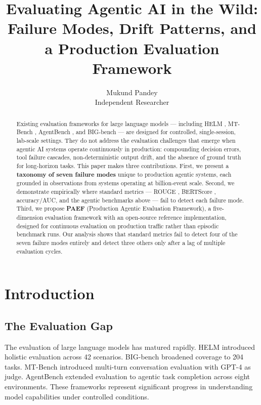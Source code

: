 \documentclass{article}
\title{Evaluating Agentic AI in the Wild: Failure Modes, Drift Patterns,
       and a Production Evaluation Framework}
\author{%
  Mukund Pandey \\
  Independent Researcher
}
\begin{document}
\maketitle

\begin{abstract}
Existing evaluation frameworks for large language models --- including HELM
\citep{liang2022helm}, MT-Bench \citep{zheng2023mtbench}, AgentBench
\citep{liu2023agentbench}, and BIG-bench \citep{srivastava2022bigbench} --- are
designed for controlled, single-session, lab-scale settings.  They do not
address the evaluation challenges that emerge when agentic AI systems operate
continuously in production: compounding decision errors, tool failure cascades,
non-deterministic output drift, and the absence of ground truth for
long-horizon tasks.  This paper makes three contributions.  First, we present
a \textbf{taxonomy of seven failure modes} unique to production agentic systems,
each grounded in observations from systems operating at billion-event scale.
Second, we demonstrate empirically where standard metrics ---
ROUGE \citep{lin2004rouge}, BERTScore \citep{zhang2019bertscore},
accuracy/AUC, and the agentic benchmarks above --- fail to detect each failure
mode.  Third, we propose \textbf{PAEF} (Production Agentic Evaluation
Framework), a five-dimension evaluation framework with an open-source reference
implementation, designed for continuous evaluation on production traffic rather
than episodic benchmark runs.  Our analysis shows that standard metrics fail
to detect four of the seven failure modes entirely and detect three others only
after a lag of multiple evaluation cycles.
\end{abstract}

\section{Introduction}
\label{sec:intro}

\subsection{The Evaluation Gap}

The evaluation of large language models has matured rapidly.  HELM
\citep{liang2022helm} introduced holistic evaluation across 42 scenarios.
BIG-bench \citep{srivastava2022bigbench} broadened coverage to 204 tasks.
MT-Bench \citep{zheng2023mtbench} introduced multi-turn conversation evaluation
with GPT-4 as judge.  AgentBench \citep{liu2023agentbench} extended evaluation
to agentic task completion across eight environments.  These frameworks
represent significant progress in understanding model capabilities under
controlled conditions.
\end{document}
